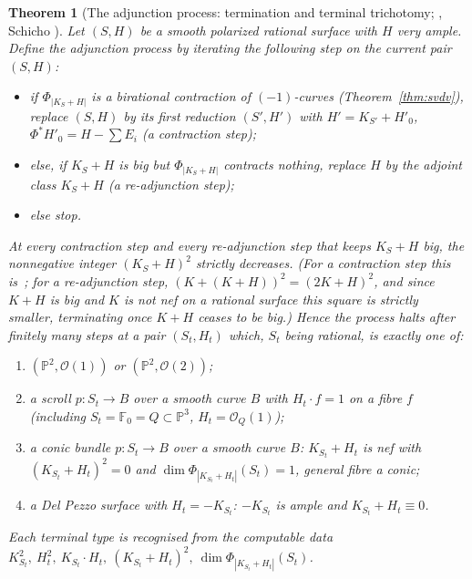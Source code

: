 \documentclass{amsart}
\theoremstyle{plain}
\newtheorem{theorem}{Theorem}
\theoremstyle{definition}
\newcommand{\PP}{\mathbb{P}}
\newcommand{\cO}{\mathcal{O}}
\begin{document}
\begin{theorem}[The adjunction process: termination and terminal trichotomy;
{\cite[Ch.~7]{BS}}, Schicho {\cite[\S3]{Schicho}}]\label{thm:adjterm}
Let $(S,H)$ be a smooth polarized rational surface with $H$ very ample.  Define
the \emph{adjunction process} by iterating the following step on the current
pair $(S,H)$:
\begin{itemize}
\item if $\Phi_{|K_S+H|}$ is a birational contraction of $(-1)$-curves
(Theorem~\ref{thm:svdv}), replace $(S,H)$ by its first reduction $(S',H')$ with
$H'=K_{S'}+H'_0$, $\Phi^*H'_0=H-\sum E_i$ \textup{(}a \emph{contraction
step}\textup{)};
\item else, if $K_S+H$ is big but $\Phi_{|K_S+H|}$ contracts nothing, replace $H$
by the adjoint class $K_S+H$ \textup{(}a \emph{re-adjunction step}\textup{)};
\item else stop.
\end{itemize}
At every contraction step and every re-adjunction step that keeps $K_S+H$ big,
the nonnegative integer $(K_S+H)^2$ strictly decreases.  \textup{(}For a
contraction step this is~\cite[Ch.~7]{BS}; for a re-adjunction step,
$(K+(K+H))^2=(2K+H)^2$, and since $K+H$ is big and $K$ is not nef on a rational
surface this square is strictly smaller, terminating once $K+H$ ceases to be
big.\textup{)}  Hence the process halts after finitely many steps at a pair
$(S_t,H_t)$ which, $S_t$ being rational, is exactly one of:
\begin{enumerate}
\item[\textup{(a)}] $(\PP^2,\cO(1))$ or $(\PP^2,\cO(2))$;
\item[\textup{(b)}] a scroll $p\colon S_t\to B$ over a smooth curve $B$ with
$H_t\cdot f=1$ on a fibre $f$ \textup{(}including
$S_t=\mathbb F_0=Q\subset\PP^3$, $H_t=\cO_Q(1)$\textup{)};
\item[\textup{(c)}] a conic bundle $p\colon S_t\to B$ over a smooth curve $B$:
$K_{S_t}+H_t$ is nef with $(K_{S_t}+H_t)^2=0$ and $\dim\Phi_{|K_{S_t}+H_t|}(S_t)
=1$, general fibre a conic;
\item[\textup{(d)}] a Del Pezzo surface with $H_t=-K_{S_t}$: $-K_{S_t}$ is ample
and $K_{S_t}+H_t\equiv0$.
\end{enumerate}
Each terminal type is recognised from the computable data
$K_{S_t}^2,\ H_t^2,\ K_{S_t}\cdot H_t,\ (K_{S_t}+H_t)^2,\
\dim\Phi_{|K_{S_t}+H_t|}(S_t)$.
\end{theorem}
\end{document}
